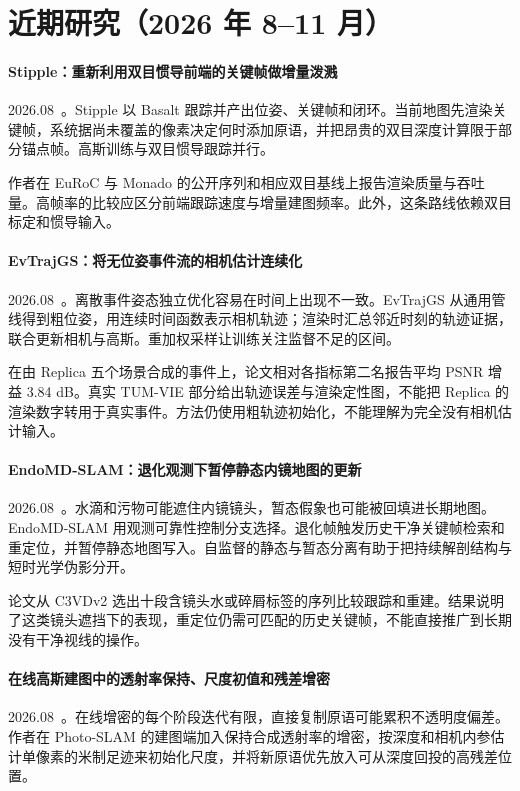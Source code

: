 \section{近期研究（2026 年 8--11 月）}
\paragraph{Stipple：重新利用双目惯导前端的关键帧做增量泼溅}
2026.08~\cite{2608_00931}。Stipple 以 Basalt 跟踪并产出位姿、关键帧和闭环。当前地图先渲染关键帧，系统据尚未覆盖的像素决定何时添加原语，并把昂贵的双目深度计算限于部分锚点帧。高斯训练与双目惯导跟踪并行。

作者在 EuRoC 与 Monado 的公开序列和相应双目基线上报告渲染质量与吞吐量。高帧率的比较应区分前端跟踪速度与增量建图频率。此外，这条路线依赖双目标定和惯导输入。

\paragraph{EvTrajGS：将无位姿事件流的相机估计连续化}
2026.08~\cite{2608_08585}。离散事件姿态独立优化容易在时间上出现不一致。EvTrajGS 从通用管线得到粗位姿，用连续时间函数表示相机轨迹；渲染时汇总邻近时刻的轨迹证据，联合更新相机与高斯。重加权采样让训练关注监督不足的区间。

在由 Replica 五个场景合成的事件上，论文相对各指标第二名报告平均 PSNR 增益 3.84 dB。真实 TUM-VIE 部分给出轨迹误差与渲染定性图，不能把 Replica 的渲染数字转用于真实事件。方法仍使用粗轨迹初始化，不能理解为完全没有相机估计输入。

\paragraph{EndoMD-SLAM：退化观测下暂停静态内镜地图的更新}
2026.08~\cite{2608_08949}。水滴和污物可能遮住内镜镜头，暂态假象也可能被回填进长期地图。EndoMD-SLAM 用观测可靠性控制分支选择。退化帧触发历史干净关键帧检索和重定位，并暂停静态地图写入。自监督的静态与暂态分离有助于把持续解剖结构与短时光学伪影分开。

论文从 C3VDv2 选出十段含镜头水或碎屑标签的序列比较跟踪和重建。结果说明了这类镜头遮挡下的表现，重定位仍需可匹配的历史关键帧，不能直接推广到长期没有干净视线的操作。

\paragraph{在线高斯建图中的透射率保持、尺度初值和残差增密}
2026.08~\cite{2608_14902}。在线增密的每个阶段迭代有限，直接复制原语可能累积不透明度偏差。作者在 Photo-SLAM 的建图端加入保持合成透射率的增密，按深度和相机内参估计单像素的米制足迹来初始化尺度，并将新原语优先放入可从深度回投的高残差位置。

